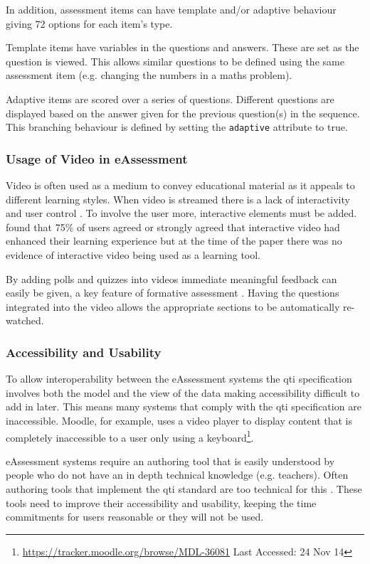 In addition, assessment items can have template and/or adaptive behaviour giving 72 options for each item's type. 

Template items have variables in the questions and answers. These are set as the question is viewed. This allows similar questions to be defined using the same assessment item (e.g. changing the numbers in a maths problem).

Adaptive items are scored over a series of questions. Different questions are displayed based on the answer given for the previous question(s) in the sequence. This branching behaviour is defined by setting the \lstinline!adaptive! attribute to true. 

\subsubsection{Usage of Video in eAssessment}
\label{Subsubsection:Usage of Video in eAssessment}
Video is often used as a medium to convey educational material as it appeals to different learning styles. When video is streamed there is a lack of interactivity and user control \citep{eps267281}. To involve the user more, interactive elements must be added. \cite{eps267281} found that 75\% of users agreed or strongly agreed that interactive video had enhanced their learning experience but at the time of the paper there was no evidence of interactive video being used as a learning tool.

By adding polls and quizzes into videos immediate meaningful feedback can easily be given, a key feature of formative assessment \citep{eps265979}. Having the questions integrated into the video allows the appropriate sections to be automatically re-watched. 
\subsubsection{Accessibility and Usability}
\label{Subsubsection:Accessibility and Usability}
To allow interoperability between the \gls{eAssessment} systems the \gls{qti} specification involves both the model and the view of the data \citep{wikieassessment} making accessibility difficult to add in later. This means many systems that comply with the \gls{qti} specification are inaccessible. Moodle, for example, uses a video player to display content that is completely inaccessible to a user only using a keyboard\footnote{\url{https://tracker.moodle.org/browse/MDL-36081} Last Accessed: 24 Nov 14}.

\gls{eAssessment} systems require an authoring tool that is easily understood by people who do not have an in depth technical knowledge (e.g. teachers). Often authoring tools that implement the \gls{qti} standard are too technical for this \citep{wikieassessment}. These tools need to improve their accessibility and usability, keeping the time commitments for users reasonable \citep{eps271236, eps265979} or they will not be used.

